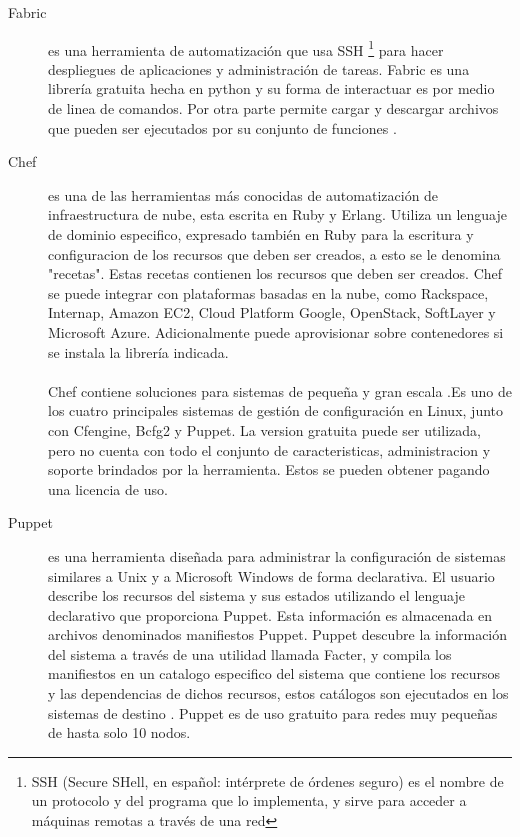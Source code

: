 \documentclass[conference, spanish]{IEEEtran}
\begin{document}
\begin{description}
\item [Fabric]
 es una herramienta de automatización que usa SSH \footnote{SSH (Secure SHell, en español: intérprete de órdenes seguro) es el nombre de un protocolo y del programa que lo implementa, y sirve para acceder a máquinas remotas a través de una red} para hacer despliegues de aplicaciones y administración de tareas. Fabric es una librería gratuita hecha en python y su forma de interactuar es por medio de linea de comandos. Por otra parte permite cargar y descargar archivos que pueden ser ejecutados por su conjunto de funciones \cite{fabfile16}.

\item [Chef]
es una de las herramientas más conocidas de automatización de infraestructura de nube, esta escrita en Ruby y Erlang. Utiliza un lenguaje de dominio especifico, expresado también en Ruby para la escritura y configuracion de los recursos que deben ser creados, a esto se le denomina "recetas". Estas recetas contienen los recursos que deben ser creados. Chef se puede integrar con plataformas basadas en la nube, como Rackspace, Internap, Amazon EC2, Cloud Platform Google, OpenStack, SoftLayer y Microsoft Azure. Adicionalmente puede aprovisionar sobre contenedores si se instala la librería indicada. \\
\\
Chef contiene soluciones para sistemas de pequeña y gran escala \cite{Chef15}.Es uno de los cuatro principales sistemas de gestión de configuración en Linux, junto con Cfengine, Bcfg2 y Puppet. La version gratuita puede ser utilizada, pero no cuenta con todo el conjunto de caracteristicas, administracion y soporte brindados por la herramienta. Estos se pueden obtener pagando una licencia de uso.


\item [Puppet]
es una herramienta diseñada para administrar la configuración de sistemas similares a Unix y a Microsoft Windows de forma declarativa. El usuario describe los recursos del sistema y sus estados utilizando el lenguaje declarativo que proporciona Puppet. Esta información es almacenada en archivos denominados manifiestos Puppet. Puppet descubre la información del sistema a través de una utilidad llamada Facter, y compila los manifiestos en un catalogo especifico del sistema que contiene los recursos y las dependencias de dichos recursos, estos catálogos son ejecutados en los sistemas de destino \cite{Pupet15}. Puppet es de uso gratuito para redes muy pequeñas de hasta solo 10 nodos.


\end{description}
\end{document}
